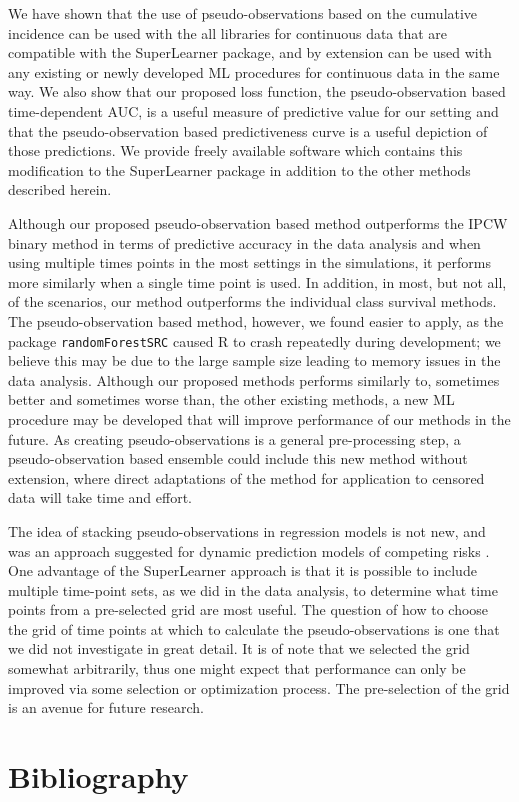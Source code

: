 \documentclass{statsoc}
\begin{document}
We have shown that the use of pseudo-observations based on the cumulative incidence can be used with the all libraries for continuous data that are compatible with the SuperLearner package, and by extension can be used with any existing or newly developed ML procedures for continuous data in the same way. We also show that our proposed loss function, the pseudo-observation based time-dependent AUC, is a useful measure of predictive value for our setting and that the pseudo-observation based predictiveness curve is a useful depiction of those predictions. We provide freely available software which contains this modification to the SuperLearner package in addition to the other methods described herein.

Although our proposed pseudo-observation based method outperforms the IPCW binary method in terms of predictive accuracy in the data analysis and when using multiple times points in the most settings in the simulations, it performs more similarly when a single time point is used. In addition, in most, but not all, of the scenarios, our method outperforms the individual class survival methods. The pseudo-observation based method, however, we found easier to apply, as the package \texttt{randomForestSRC} caused R to crash repeatedly during development; we believe this may be due to the large sample size leading to memory issues in the data analysis. Although our proposed methods performs similarly to, sometimes better and sometimes worse than, the other existing methods, a new ML procedure may be developed that will improve performance of our methods in the future. As creating pseudo-observations is a general pre-processing step, a pseudo-observation based ensemble could include this new method without extension, where direct adaptations of the method for application to censored data will take time and effort. 

The idea of stacking pseudo-observations in regression models is not new, and was an approach suggested for dynamic prediction models of competing risks \citep{nicolaie2013dynamic}. One advantage of the SuperLearner approach is that it is possible to include multiple time-point sets, as we did in the data analysis, to determine what time points from a pre-selected grid are most useful. The question of how to choose the grid of time points at which to calculate the pseudo-observations is one that we did not investigate in great detail. It is of note that we selected the grid somewhat arbitrarily, thus one might expect that performance can only be improved via some selection or optimization process. The pre-selection of the grid is an avenue for future research. 



\section{Bibliography}



\end{document}
